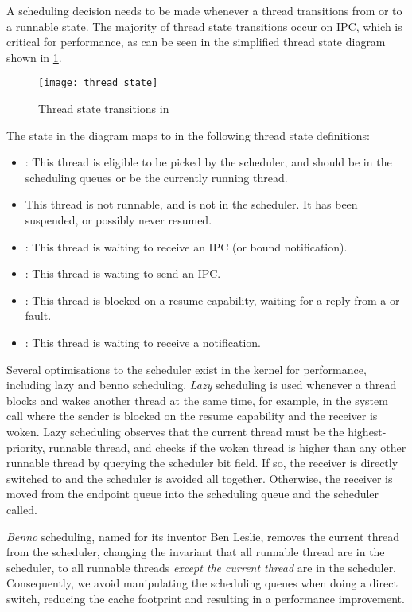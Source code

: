 A scheduling decision needs to be made whenever a thread transitions from or to a runnable state.
The majority of thread state transitions occur on IPC, which is critical for performance, 
as can be seen in the simplified thread state diagram shown in \cref{f:thread_state}. 
\begin{figure}[h!tb]
    \centering
    \texttt{[image: thread\_state]}
    \caption{Thread state transitions in \selfour}
    \label{f:thread_state}
\end{figure}
The  state in the diagram maps to  in the following thread
state definitions:
\begin{itemize}
    \item {}: This thread is eligible to be picked by the scheduler, and should be in the
        scheduling queues or be the currently running thread.
    \item {} This thread is not runnable, and is not in the scheduler. It has been
        suspended, or possibly never resumed. 
    \item {}: This thread is waiting to receive an IPC (or bound notification). 
    \item {}: This thread is waiting to send an IPC. 
    \item {}: This thread is blocked on a resume capability, waiting for a reply
        from a \call or fault.
    \item {}: This thread is waiting to receive a notification.
\end{itemize}

Several optimisations to the scheduler exist in the kernel for performance, including lazy and benno
scheduling. 
\emph{Lazy} scheduling is used whenever a thread blocks and wakes
another thread at the same time, for example, in the \call system call where the sender is
blocked on the resume capability and the receiver is woken. Lazy scheduling observes that the
current thread must be the highest-priority, runnable thread, and checks if the woken thread is
higher than any other runnable thread by querying the scheduler bit field. If so, the receiver is
directly switched to and the scheduler is avoided all together. Otherwise, the receiver is moved from
the endpoint queue into the scheduling queue and the scheduler called.

\emph{Benno} scheduling, named for its inventor Ben Leslie, removes the current thread from the 
scheduler, changing the invariant that all runnable thread are in the scheduler, to all runnable
threads \emph{except the current thread} are in the scheduler. Consequently, we avoid manipulating the
scheduling queues when doing a direct switch, reducing the cache footprint and resulting in a performance improvement.

